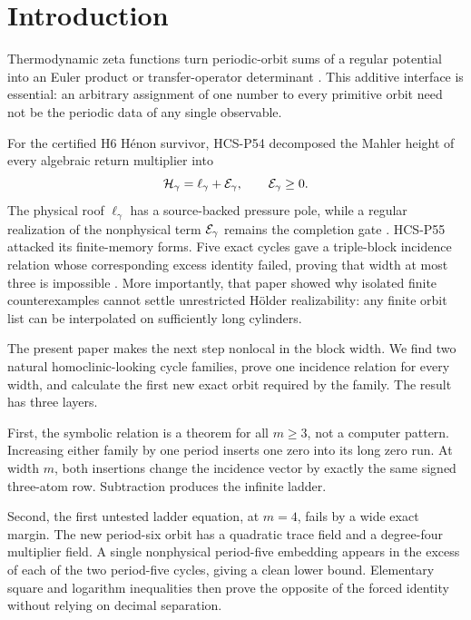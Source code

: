 \section{Introduction}

Thermodynamic zeta functions turn periodic-orbit sums of a regular potential
into an Euler product or transfer-operator determinant
\citep{Bowen1975,ParryPollicott1990}.  This additive interface is essential:
an arbitrary assignment of one number to every primitive orbit need not be
the periodic data of any single observable.

For the certified H6 H\'enon survivor, HCS-P54 decomposed the Mahler height
of every algebraic return multiplier into
\begin{equation}\label{eq:intro-split}
 \mathcal H_\gamma=\ell_\gamma+\mathcal E_\gamma,
 \qquad \mathcal E_\gamma\geq0.
\end{equation}
The physical roof \(\ell_\gamma\) has a source-backed pressure pole, while a
regular realization of the nonphysical term \(\mathcal E_\gamma\) remains the
completion gate \citep{WangP54}.  HCS-P55 attacked its finite-memory forms.
Five exact cycles gave a triple-block incidence relation whose corresponding
excess identity failed, proving that width at most three is impossible
\citep{WangP55}.  More importantly, that paper showed why isolated finite
counterexamples cannot settle unrestricted H\"older realizability: any
finite orbit list can be interpolated on sufficiently long cylinders.

The present paper makes the next step nonlocal in the block width.  We find
two natural homoclinic-looking cycle families, prove one incidence relation
for every width, and calculate the first new exact orbit required by the
family.  The result has three layers.

First, the symbolic relation is a theorem for all \(m\geq3\), not a computer
pattern.  Increasing either family by one period inserts one zero into its
long zero run.  At width \(m\), both insertions change the incidence vector
by exactly the same signed three-atom row.  Subtraction produces the
infinite ladder.

Second, the first untested ladder equation, at \(m=4\), fails by a wide
exact margin.  The new period-six orbit has a quadratic trace field and a
degree-four multiplier field.  A single nonphysical period-five embedding
appears in the excess of each of the two period-five cycles, giving a clean
lower bound.  Elementary square and logarithm inequalities then prove the
opposite of the forced identity without relying on decimal separation.

